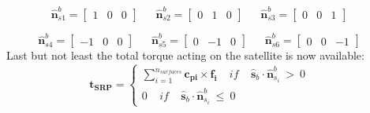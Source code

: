\documentclass[11pt]{article}
\begin{document}
\begin{equation}
\hat{\mathbf{n}}_{s1}^b=\begin{bmatrix}
1&0&0
\end{bmatrix}
\ \ \ \ \ \ \ 
\hat{\mathbf{n}}_{s2}^b=\begin{bmatrix}
0&1&0
\end{bmatrix}
\ \ \ \ \ \ \
\hat{\mathbf{n}}_{s3}^b=\begin{bmatrix}
0&0&1
\end{bmatrix}
\end{equation}

\begin{equation}
\hat{\mathbf{n}}_{s4}^b=\begin{bmatrix}
-1&0&0
\end{bmatrix}
\ \ \ \ \ \ \ 
\hat{\mathbf{n}}_{s5}^b=\begin{bmatrix}
0&-1&0
\end{bmatrix}
\ \ \ \ \ \ \ 
\hat{\mathbf{n}}_{s6}^b=\begin{bmatrix}
0&0&-1
\end{bmatrix}
\end{equation}\
Last but not least the total torque acting on the satellite is now available:
\begin{equation}
\mathbf{t_{SRP}}=\begin{cases}
\sum_{i=1}^{n_{surfaces}} \mathbf{c_{pi}} \times \mathbf{f_i} \ \ \ \ \ if \ \ \ \ \ \hat{\mathbf{s}}_b \cdot  \hat{\mathbf{n}}_{s_i}^b \ > \ 0 \\
0 \ \ \ \ \ if \ \ \ \ \ \hat{\mathbf{s}}_b\cdot  \hat{\mathbf{n}}_{s_i}^b \ \leq\ 0 
\end{cases}
\end{equation}
\end{document}

